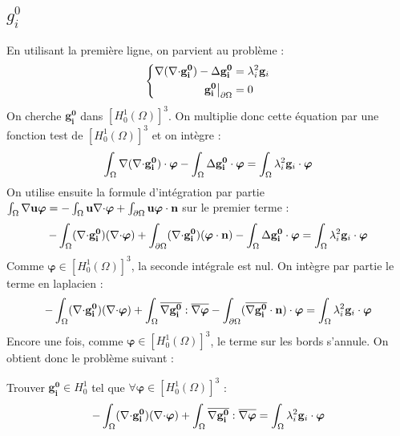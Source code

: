 \subsection{$g_i^0$}
En utilisant la première ligne, on parvient au problème :
\begin{equation*}
\left\{\begin{aligned}
{\nabla}({\nabla\cdot} \mathbf{g_i^0})-{\Delta} \mathbf{g_i^0} &= \lambda_i^2\mathbf{g}_i\\
\mathbf{g_i^0}{\big\rvert_{\partial\Omega}} &= 0
\end{aligned}\right.
\end{equation*}
On cherche $\mathbf{g_i^0}$ dans $[H^1_0(\Omega)]^3$. On multiplie donc cette équation par une fonction test de $[H^1_0(\Omega)]^3$ et on intègre :
\[ \int_\Omega {\nabla}({\nabla\cdot} \mathbf{g_i^0})\cdot\bm{\varphi} - \int_\Omega {\Delta} \mathbf{g_i^0}\cdot\bm{\varphi} = \int_\Omega \lambda_i^2\mathbf{g}_i\cdot\bm{\varphi} \]
On utilise ensuite la formule d'intégration par partie $\int_\Omega {\nabla}{\mathbf{u}}\bm{\varphi} = -\int_\Omega \mathbf{u}{\nabla\cdot}\bm{\varphi} + \int_{\partial\Omega} \mathbf{u}\bm{\varphi}\cdot \mathbf{n}$ sur le premier terme :
\[ -\int_\Omega ({\nabla\cdot} \mathbf{g_i^0})({\nabla\cdot}\bm{\varphi}) + \int_{\partial\Omega} ({\nabla\cdot} \mathbf{g_i^0})(\bm{\varphi}\cdot \mathbf{n}) - \int_\Omega {\Delta} \mathbf{g_i^0}\cdot\bm{\varphi} = \int_\Omega \lambda_i^2\mathbf{g}_i\cdot\bm{\varphi} \]
Comme $\bm{\varphi}\in [H^1_0(\Omega)]^3$, la seconde intégrale est nul. On intègre par partie le terme en laplacien :
\[ -\int_\Omega ({\nabla\cdot} \mathbf{g_i^0})({\nabla\cdot}\bm{\varphi}) + \int_\Omega \overline{{\nabla} \mathbf{g_i^0}}:\overline{{\nabla}\bm{\varphi}} - \int_{\partial\Omega} (\overline{{\nabla} \mathbf{g_i^0}}\cdot \mathbf{n})\cdot\bm{\varphi} = \int_\Omega \lambda_i^2\mathbf{g}_i\cdot\bm{\varphi} \]
Encore une fois, comme $\bm{\varphi}\in [H^1_0(\Omega)]^3$, le terme sur les bords s'annule. On obtient donc le problème suivant :
\begin{pb}\label{fvgi0}
Trouver $\mathbf{g_i^0}\in H^1_0$ tel que $\forall \bm{\varphi}\in [H^1_0(\Omega)]^3$ :
\begin{equation*}
-\int_\Omega ({\nabla\cdot} \mathbf{g_i^0})({\nabla\cdot}\bm{\varphi}) + \int_\Omega \overline{{\nabla} \mathbf{g_i^0}}:\overline{{\nabla}\bm{\varphi}} = \int_\Omega \lambda_i^2\mathbf{g}_i\cdot\bm{\varphi}
\end{equation*}\end{pb}

